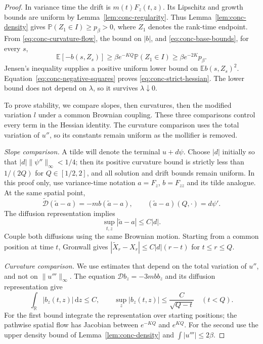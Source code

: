 \documentclass[11pt,a4paper]{article}
\numberwithin{equation}{section}
\theoremstyle{definition}
\theoremstyle{remark}
\newcommand{\E}{\mathbb E}
\newcommand{\Prob}{\mathbb P}
\newcommand{\R}{\mathbb R}
\newcommand{\dd}{\mathrm d}
\begin{document}
\begin{proof}
In variance time the drift is $m(t)F_z(t,z)$.  Its Lipschitz and growth
bounds are uniform by Lemma~\ref{lem:conc-regularity}.  Thus
Lemma~\ref{lem:conc-density} gives $\Prob(Z_1\in I)\geq p_\beta>0$,
where $Z_1$ denotes the rank-time endpoint.  From
\eqref{eq:conc-curvature-flow}, the bound on $|b|$, and
\eqref{eq:conc-base-bounds}, for every $s$,
\[
 \E[-b(s,Z_s)]\geq\beta e^{-KQ}\Prob(Z_1\in I)
       \geq\beta e^{-2K}p_\beta.
\]
Jensen's inequality supplies a positive uniform lower bound on
$\E b(s,Z_s)^2$.  Equation~\eqref{eq:conc-negative-squares} proves
\eqref{eq:conc-strict-hessian}.  The lower bound does not depend on
$\lambda$, so it survives $\lambda\downarrow0$.

To prove stability, we compare slopes, then curvatures, then the modified
variation $l$ under a common Brownian coupling.  These three comparisons
control every term in the Hessian identity.  The curvature comparison uses
the total variation of $u''$, so its constants remain uniform as the
mollifier is removed.

\emph{Slope comparison.}
A tilde will denote the terminal $u+d\psi$.
Choose $|d|$ initially so that
$|d|\|\psi''\|_\infty<1/4$; then its positive curvature bound is strictly
less than $1/(2Q)$ for $Q\in[1/2,2]$, and all solution and drift bounds
remain uniform.  In this proof only, use variance-time notation
$a=F_z$, $b=F_{zz}$ and its tilde analogue.  At the same spatial point,
\[
 \widetilde{\mathcal D}(\widetilde a-a)
       =-m b(\widetilde a-a),\qquad
 (\widetilde a-a)(Q,\cdot)=d\psi'.
\]
The diffusion representation implies
\begin{equation}
 \sup_{t,z}|\widetilde a-a|\leq C|d|.
 \label{eq:conc-slope-stability}
\end{equation}
Couple both diffusions using the same Brownian motion.  Starting from a
common position at time $t$, Gronwall gives
$|\widetilde X_r-X_r|\leq C|d|(r-t)$ for $t\leq r\leq Q$.

\emph{Curvature comparison.}
We use estimates that depend on the total variation of
$u''$, and not on $\|u'''\|_\infty$.  The equation
$\mathcal D b_z=-3mbb_z$ and its diffusion representation give
\begin{equation}
 \int_\R|b_z(t,z)|\,\dd z\leq C,
 \qquad \sup_z|b_z(t,z)|\leq\frac{C}{\sqrt{Q-t}}\quad(t<Q).
 \label{eq:conc-curvature-bv}
\end{equation}
For the first bound integrate the representation over starting positions;
the pathwise spatial flow has Jacobian between $e^{-KQ}$ and $e^{KQ}$.
For the second use the upper density bound of
Lemma~\ref{lem:conc-density} and
$\int|u'''|\leq2\beta$.


\end{proof}
\end{document}
